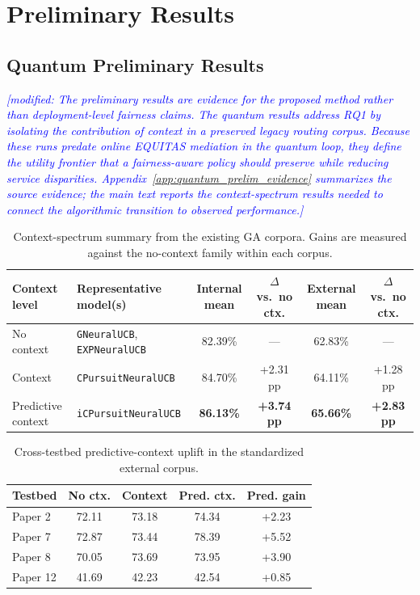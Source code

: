 \documentclass[conference]{IEEEtran}
\newcommand{\modified}[1]{\textcolor{blue}{{\it [modified: #1]}}}
\begin{document}
\section{Preliminary Results}
\subsection{Quantum Preliminary Results}
\modified{The preliminary results are evidence for the proposed method rather
than deployment-level fairness claims. The quantum results address RQ1 by
isolating the contribution of context in a preserved legacy routing corpus.
Because these runs predate online EQUITAS mediation in the quantum loop, they
define the utility frontier that a fairness-aware policy should preserve while
reducing service disparities. Appendix~\ref{app:quantum_prelim_evidence}
summarizes the source evidence; the main text reports the context-spectrum
results needed to connect the algorithmic transition to observed performance.}

\begin{table}[t]
\caption{Context-spectrum summary from the existing GA corpora. Gains are measured
against the no-context family within each corpus.}
\label{tab:context_spectrum}
\centering
\small
\setlength{\tabcolsep}{5pt}
\begin{tabular}{p{}p{}cccc}
\toprule
\textbf{Context level} & \textbf{Representative model(s)} & \textbf{Internal mean} & \textbf{$\Delta$ vs.\ no ctx.} & \textbf{External mean} & \textbf{$\Delta$ vs.\ no ctx.} \\
\midrule
No context & \texttt{GNeuralUCB}, \texttt{EXPNeuralUCB} & 82.39\% & --- & 62.83\% & --- \\
Context & \texttt{CPursuitNeuralUCB} & 84.70\% & +2.31 pp & 64.11\% & +1.28 pp \\
Predictive context & \texttt{iCPursuitNeuralUCB} & \textbf{86.13\%} & \textbf{+3.74 pp} & \textbf{65.66\%} & \textbf{+2.83 pp} \\
\bottomrule
\end{tabular}
\end{table}

\begin{table}[t]
\caption{Cross-testbed predictive-context uplift in the standardized external
corpus.}
\label{tab:paper_context_uplift}
\centering
\small
\setlength{\tabcolsep}{4pt}
\begin{tabular}{lcccc}
\toprule
\textbf{Testbed} & \textbf{No ctx.} & \textbf{Context} & \textbf{Pred. ctx.} & \textbf{Pred. gain} \\
\midrule
Paper 2 & 72.11 & 73.18 & 74.34 & +2.23 \\
Paper 7 & 72.87 & 73.44 & 78.39 & +5.52 \\
Paper 8 & 70.05 & 73.69 & 73.95 & +3.90 \\
Paper 12 & 41.69 & 42.23 & 42.54 & +0.85 \\
\bottomrule
\end{tabular}
\end{table}
\end{document}
